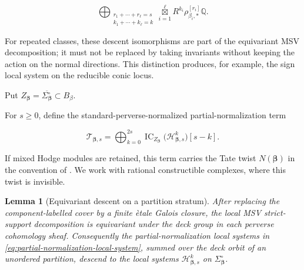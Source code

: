 \documentclass[11pt,reqno]{amsart}
\newtheorem{lemma}[theorem]{Lemma}
\theoremstyle{definition}
\newcommand{\Q}{\mathbb Q}
\newcommand{\IC}{\operatorname{IC}}
\newcommand{\bigboxtimes}{\mathop{\boxtimes}\limits}
\begin{document}
\begin{equation}\label{eq:partial-normalization-local-system}
 \bigoplus_{\substack{r_1+\cdots+r_\ell=s\\
                       k_1+\cdots+k_\ell=k}}
 \bigboxtimes_{i=1}^{\ell}
 R^{k_i}\rho_{\beta_i,*}^{[r_i]}\Q.
\end{equation}

For repeated classes, these descent isomorphisms are part of the equivariant MSV
decomposition; it must not be replaced by taking invariants without keeping
the action on the normal directions.  This distinction produces, for example,
the sign local system on the reducible conic locus.

Put
$Z_{\boldsymbol\beta}=\overline{\Sigma_{\boldsymbol\beta}^{\circ}}
\subset B_\beta$.

For $s\ge0$, define the standard-perverse-normalized partial-normalization
term

\begin{equation}\label{eq:boundary-term}
  \mathcal T_{\boldsymbol\beta,s}
  =\bigoplus_{k=0}^{2s}
  \IC_{Z_{\boldsymbol\beta}}
  \bigl(\mathcal H_{\boldsymbol\beta,s}^k\bigr)[s-k].
\end{equation}

If mixed Hodge modules are retained, this term carries the Tate twist
$N(\boldsymbol\beta)$ in the convention of \cite{MSV}.  We work with
rational constructible complexes, where this twist is invisible.

\begin{lemma}[Equivariant descent on a partition stratum]
\label{lem:partition-descent}
After replacing the component-labelled cover by a finite \`etale Galois
closure, the local MSV strict-support decomposition is equivariant under the
deck group in each perverse cohomology sheaf.  Consequently the
partial-normalization local systems in
\eqref{eq:partial-normalization-local-system}, summed over the deck orbit of
an unordered partition, descend to the local systems
$\mathcal H_{\boldsymbol\beta,s}^k$ on
$\Sigma_{\boldsymbol\beta}^{\circ}$.
\end{lemma}
\end{document}
